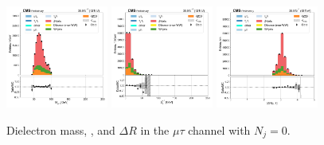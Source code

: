 \begin{figure}[htb!]
    \centering
    \includegraphics[width=0.3\textwidth]{chapters/Analysis/sectionPlots/figures/data_mc_overlays/mutau_2016_cat_eq0_eq0_signal_linear_lepton_dilepton1_mass}
    \includegraphics[width=0.3\textwidth]{chapters/Analysis/sectionPlots/figures/data_mc_overlays/mutau_2016_cat_eq0_eq0_signal_linear_lepton_dilepton1_pt}
    \includegraphics[width=0.3\textwidth]{chapters/Analysis/sectionPlots/figures/data_mc_overlays/mutau_2016_cat_eq0_eq0_signal_linear_lepton_dilepton1_delta_r}
    \caption{Dielectron mass, \pt, and $\Delta R$ in the $\mu\tau$ channel
    with $N_{j} = 0$.}
    \label{fig:analysis:plots:mutau_1_dilepton}
\end{figure}

